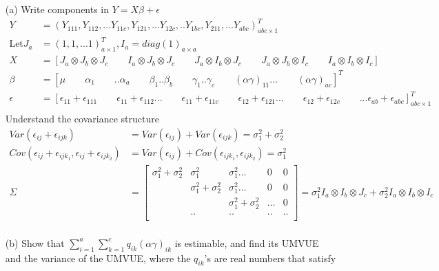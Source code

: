 \documentclass{homework}
\begin{document}
\begin{itemize}
    \item [(a)] Write components in $Y= X\beta + \epsilon$\\
 \begin{align*}
Y &= (Y_{111}, Y_{112}, ... Y_{11c}, Y_{121},... Y_{12c}, ..Y_{1bc}, Y_{211}, ... Y_{abc})^T_{abc\times 1}\\
\text{Let} J_a &= (1,1,...1)^T_{a\times 1}, I_a= diag(1)_{a\times a}\\
X &= [J_a \otimes J_b \otimes J_c \qquad I_a \otimes J_b \otimes J_c \qquad J_a \otimes I_b \otimes J_c \qquad J_a \otimes J_b \otimes I_c \qquad I_a \otimes I_b \otimes I_c]\\
\beta &= [\mu \qquad \alpha_1 \qquad ..\alpha_a \qquad \beta_1.. \beta_b \qquad \gamma_1.. \gamma_c \qquad (\alpha \gamma)_{11}... \qquad (\alpha \gamma)_{ac}]^T\\
\epsilon &= [\epsilon_{11} + \epsilon_{111} \qquad \epsilon_{11}+\epsilon_{112} ... \qquad \epsilon_{11}+ \epsilon_{11c} \qquad \epsilon_{12}+\epsilon_{121} ... \qquad \epsilon_{12}+\epsilon_{12c} \qquad ... \epsilon_{ab}+\epsilon_{abc}]^T_{abc \times 1}\\
\end{align*}   
Understand the covariance structure
 \begin{align*}
Var(\epsilon_{ij} + \epsilon_{ijk}) &= Var(\epsilon_{ij}) + Var(\epsilon_{ijk}) = \sigma_1^2 + \sigma_2^2\\
Cov(\epsilon_{ij} + \epsilon_{ijk_1}, \epsilon_{ij} + \epsilon_{ijk_2 }) &= Var(\epsilon_{ij}) + Cov(\epsilon_{ijk_1}, \epsilon_{ijk_2}) = \sigma_1^2\\
\Sigma &= \begin{bmatrix}
           \sigma_1^2 + \sigma_2^2 &  \sigma_1^2 &\sigma_1^2... & 0 & 0 \\
            &  \sigma_1^2 + \sigma_2^2 & \sigma_1^2 ... &0 & 0\\
             &   & \sigma_1^2 + \sigma_2^2 & ... &0 \\
             &.. &.. &.. &..\\
         \end{bmatrix} = \sigma_1^2 I_a \otimes I_b \otimes J_c + \sigma_2^2 I_a \otimes I_b \otimes I_c\\
\end{align*} 
\item [(b)] Show that $\sum_{i=1}^{a} \sum_{k=1}^{c} q_{ik}(\alpha\gamma)_{ik}$ is estimable, and find its UMVUE and the variance of the UMVUE, where the $q_{ik}$'s are real numbers that satisfy\\

\end{itemize}
\end{document}
